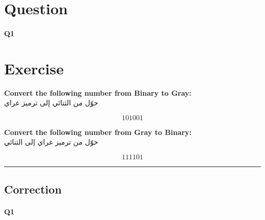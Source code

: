 
\section{Question}


\paragraph{Q1}







\section*{Exercise}

\textbf{Convert the following number from Binary to Gray:}\\
حوّل من الثنائي إلى ترميز غراي

\[
  101001
\]

\bigskip

\textbf{Convert the following number from Gray to Binary:}\\
حوّل من ترميز غراي إلى الثنائي

\[
  111101
\]




\hrule width 1\linewidth
\pagebreak

\subsection{Correction}


\paragraph{Q1}



